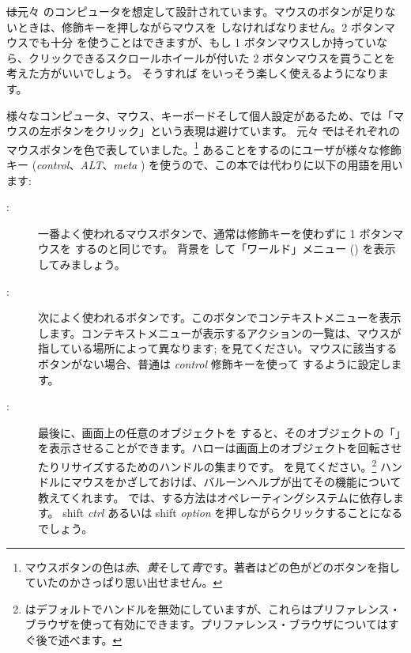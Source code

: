 \documentclass[a4paper,10pt,twoside]{book}
\begin{document}
\st は元々 のコンピュータを想定して設計されています。マウスのボタンが足りないときは、修飾キーを押しながらマウスを \click しなければなりません。2 ボタンマウスでも十分 \pharo を使うことはできますが、もし 1 ボタンマウスしか持っていなら、クリックできるスクロールホイールが付いた 2 ボタンマウスを買うことを考えた方がいいでしょう。 そうすれば \pharo をいっそう楽しく使えるようになります。

様々なコンピュータ、マウス、キーボードそして個人設定があるため、\pharo では「マウスの左ボタンをクリック」という表現は避けています。
元々 \st ではそれぞれのマウスボタンを色で表していました。\footnote{マウスボタンの色は\emph{赤}、\emph{黄}そして\emph{青}です。著者はどの色がどのボタンを指していたのかさっぱり思い出せません。}
あることをするのにユーザが様々な修飾キー (\emph{control}、\emph{ALT}、\emph{meta} \etc) を使うので、この本では代わりに以下の用語を用います:
\begin{description}
\item [\click:] 一番よく使われるマウスボタンで、通常は修飾キーを使わずに 1 ボタンマウスを \click するのと同じです。 背景を \click して「ワールド」メニュー () を表示してみましょう。
\item [\actclick:] 次によく使われるボタンです。このボタンでコンテキストメニューを表示します。コンテキストメニューが表示するアクションの一覧は、マウスが指している場所によって異なります;  を見てください。マウスに該当するボタンがない場合、普通は \emph{control} 修飾キーを使って \actclick するように設定します。
\item [\metaclick:] 最後に、画面上の任意のオブジェクトを \metaclick すると、そのオブジェクトの「」を表示させることができます。ハローは画面上のオブジェクトを回転させたりリサイズするためのハンドルの集まりです。  を見てください。\footnote{\pharo はデフォルトでハンドルを無効にしていますが、これらはプリファレンス・ブラウザを使って有効にできます。プリファレンス・ブラウザについてはすぐ後で述べます。}
ハンドルにマウスをかざしておけば、バルーンヘルプが出てその機能について教えてくれます。
\pharo では、\metaclick する方法はオペレーティングシステムに依存します。
{\sc shift} \emph{ctrl} あるいは {\sc shift} \emph{option} を押しながらクリックすることになるでしょう。
\end{description}
\end{document}

